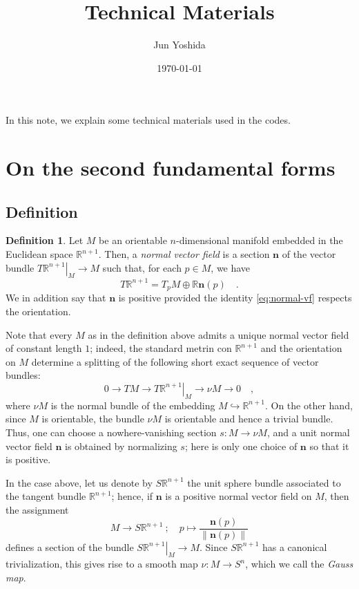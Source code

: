 \documentclass[pdftex,a4paper,12pt]{scrartcl}
\title{Technical Materials}
\author{Jun Yoshida}
\date{\today}
\theoremstyle{plain}
\theoremstyle{definition}
\newtheorem*{definition}{Definition}
\theoremstyle{remark}
\begin{document}
\maketitle

In this note, we explain some technical materials used in the codes.

\tableofcontents

\section{On the second fundamental forms}

\subsection{Definition}

\begin{definition}
Let $M$ be an orientable $n$-dimensional manifold embedded in the Euclidean space $\mathbb R^{n+1}$.
Then, a \emph{normal vector field} is a section $\mathbf n$ of the vector bundle $\left.T\mathbb R^{n+1}\right|_M\to M$ such that, for each $p\in M$, we have
\begin{equation}
\label{eq:normal-vf}
T\mathbb R^{n+1}= T_pM\oplus \mathbb R\mathbf n(p)
\quad.
\end{equation}
We in addition say that $\mathbf n$ is positive provided the identity \eqref{eq:normal-vf} respects the orientation.
\end{definition}

Note that every $M$ as in the definition above admits a unique normal vector field of constant length $1$; indeed, the standard metrin con $\mathbb R^{n+1}$ and the orientation on $M$ determine a splitting of the following short exact sequence of vector bundles:
\[
0\to TM\to \left.T\mathbb R^{n+1}\right|_M \to \nu M\to 0
\quad,
\]
where $\nu M$ is the normal bundle of the embedding $M\hookrightarrow\mathbb R^{n+1}$.
On the other hand, since $M$ is orientable, the bundle $\nu M$ is orientable and hence a trivial bundle.
Thus, one can choose a nowhere-vanishing section $s:M\to \nu M$, and a unit normal vector field $\mathbf n$ is obtained by normalizing $s$; here is only one choice of $\mathbf n$ so that it is positive.

In the case above, let us denote by $S\mathbb R^{n+1}$ the unit sphere bundle associated to the tangent bundle $\mathbb R^{n+1}$; hence, if $\mathbf n$ is a positive normal vector field on $M$, then the assignment
\[
M \to S\mathbb R^{n+1}
\ ;\quad p\mapsto \frac{\mathbf n(p)}{\|\mathbf n(p)\|}
\]
defines a section of the bundle $\left. S\mathbb R^{n+1}\right|_M\to M$.
Since $S\mathbb R^{n+1}$ has a canonical trivialization, this gives rise to a smooth map $\nu:M\to S^n$, which we call the \emph{Gauss map}.
\end{document}
